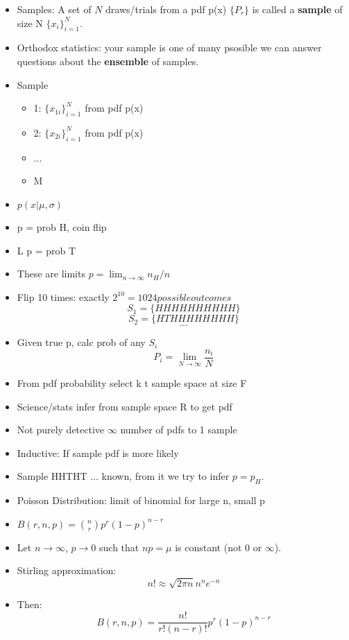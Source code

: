 \begin{itemize}
    \item Samples: A set of $N$ draws/trials from a pdf p(x) $\{ P_r \}$ is called a \textbf{sample} of size N $\{x_i \}_{i=1}^N$.
    \item Orthodox statistics: your sample is one of many psosible we can answer questions about the \textbf{ensemble} of samples.
    \item Sample
          \begin{itemize}
              \item 1: $\{ x_{1i} \}_{i=1}^N$ from pdf p(x)
              \item 2: $\{ x_{2i} \}_{i=1}^N$ from pdf p(x)
              \item ...
              \item M
          \end{itemize}
    \item $p(x|\mu, \sigma)$
    \item p = prob H, coin flip
    \item L p = prob T
    \item These are limits $p = \lim_{n\rightarrow \infty} n_H/n$

    \item Flip 10 times: exactly $2^10 = 1024 possible outcomes$
          \[ S_1 = \{ HHHHHHHHHH \} \]
          \[ S_2 = \{ HTHHHHHHHH \} \]
          \[ ... \]
    \item Given true p, calc prob of any $S_i$
          \[ P_i = \lim_{N\rightarrow \infty} \frac{n_i}{N} \]
    \item From pdf probability select k t sample space at size F
    \item Science/stats infer from sample space R to get pdf
    \item Not purely detective $\infty$ number of pdfs to 1 sample
    \item Inductive: If sample pdf is more likely
    \item Sample HHTHT ... known, from it we try to infer $p=p_H$.
    \item Poisson Distribution: limit of binomial for large n, small p
    \item $B(r,n,p) = \binom{n}{r} p^r (1-p)^{n-r}$
    \item Let $n \rightarrow \infty$, $p \rightarrow 0$ such that $np = \mu$ is constant (not 0 or $\infty$).
    \item Stirling approximation:
          \[ n! \approx \sqrt{2 \pi n}  n^n e^{-n} \]
    \item Then:
          \[ B(r,n,p) = \frac{n!}{r!(n-r)!} p^r (1-p)^{n-r} \]


\end{itemize}
